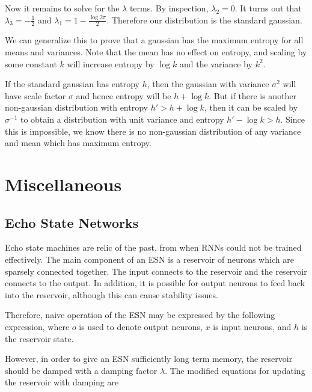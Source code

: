 \documentclass[12pt]{article}
\begin{document}
Now it remains to solve for the $\lambda$ terms. By inspection, $\lambda_2 = 0$. It turns out that $\lambda_3 = -\frac{1}{2}$ and $\lambda_1 = 1-\frac{\log 2 \pi}{2}$. Therefore our distribution is the standard gaussian.

We can generalize this to prove that a gaussian has the maximum entropy for all means and variances. Note that the mean has no effect on entropy, and scaling by some constant $k$ will increase entropy by $\log k$ and the variance by $k^2$.

If the standard gaussian has entropy $h$, then the gaussian with variance $\sigma^2$ will have scale factor $\sigma$ and hence entropy will be $h+\log k$. But if there is another non-gaussian distribution with entropy $h' > h+\log k$, then it can be scaled by $\sigma^{-1}$ to obtain a distribution with unit variance and entropy $h' - \log k > h$. Since this is impossible, we know there is no non-gaussian distribution of any variance and mean which has maximum entropy.

\section{Miscellaneous}

\subsection{Echo State Networks}

Echo state machines are relic of the past, from when RNNs could not be trained effectively. The main component of an ESN is a reservoir of neurons which are sparsely connected together. The input connects to the reservoir and the reservoir connects to the output. In addition, it is possible for output neurons to feed back into the reservoir, although this can cause stability issues.

Therefore, naive operation of the ESN may be expressed by the following expression, where $o$ is used to denote output neurons, $x$ is input neurons, and $h$ is the reservoir state.


However, in order to give an ESN sufficiently long term memory, the reservoir should be damped with a damping factor $\lambda$. The modified equations for updating the reservoir with damping are

\end{document}
